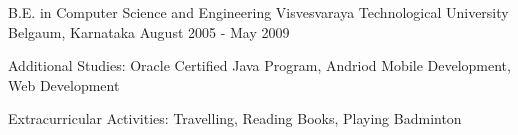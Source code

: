 \begin{cventries}
  \cventry
    {B.E. in Computer Science and Engineering}
    {Visvesvaraya Technological University}
    {Belgaum, Karnataka}
    {August 2005 - May 2009}
    {
      \begin{cvitems}
        \item{Additional Studies: Oracle Certified Java Program, Andriod Mobile Development, Web Development}
        \item {Extracurricular Activities: Travelling, Reading Books, Playing Badminton}
      \end{cvitems}
    }
\end{cventries}
